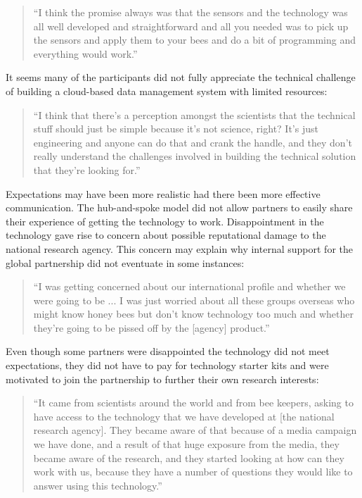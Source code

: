 \begin{quote}
\small
\enquote{I think the promise always was that the sensors and the technology was all well developed and straightforward and all you needed was to pick up the sensors and apply them to your bees and do a bit of programming and everything would work.} \\
\end{quote}

It seems many of the participants did not fully appreciate the technical challenge of building a cloud-based data management system with limited resources:

\begin{quote}
\small
\enquote{I think that there's a perception amongst the scientists that the technical stuff should just be simple because it's not science, right? It's just engineering and anyone can do that and crank the handle, and they don't really understand the challenges involved in building the technical solution that they're looking for.} \\
\end{quote}

Expectations may have been more realistic had there been more effective communication. The hub-and-spoke model did not allow partners to easily share their experience of getting the technology to work. Disappointment in the technology gave rise to concern about possible reputational damage to the national research agency. This concern may explain why internal support for the global partnership did not eventuate in some instances:

\begin{quote}
\small
\enquote{I was getting concerned about our international profile and whether we were going to be ... I was just worried about all these groups overseas who might know honey bees but don't know technology too much and whether they're going to be pissed off by the [agency] product.} \\
\end{quote}

Even though some partners were disappointed the technology did not meet expectations, they did not have to pay for technology starter kits and were motivated to join the partnership to further their own research interests:

\begin{quote}
\small
\enquote{It came from scientists around the world and from bee keepers, asking to have access to the technology that we have developed at [the national research agency]. They became aware of that because of a media campaign we have done, and a result of that huge exposure from the media, they became aware of the research, and they started looking at how can they work with us, because they have a number of questions they would like to answer using this technology.} \\
\end{quote}

